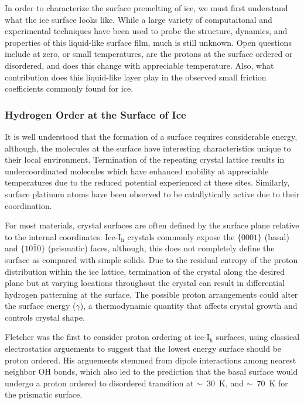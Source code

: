 In order to characterize the surface premelting of ice, we must first
understand what the ice surface looks like. While a large variety of
computaitonal and experimental techniques have been used to probe the
structure, dynamics, and properties of this liquid-like surface film,
much is still unknown. Open questions include at zero, or small
temperatures, are the protons at the surface ordered or disordered,
and does this change with appreciable temperature. Also, what
contribution does this liquid-like layer play in the observed small
friction coefficients commonly found for ice. 

\subsubsection{Hydrogen Order at the Surface of Ice}
It is well understood that the formation of a surface requires
considerable energy, although, the molecules at the surface have
interesting characteristics unique to their local
environment. Termination of the repeating crystal lattice results in
undercoordinated molecules which have enhanced mobility at appreciable
temperatures due to the reduced potential experienced at these
sites.\cite{} Similarly, surface platinum atoms have been observed to
be catallytically active due to their coordination.\cite{}

For most materials, crystal surfaces are often defined by the surface
plane relative to the internal coordinates. Ice-I$_\mathrm{h}$
crystals commonly expose the $\{0001\}$ (basal) and $\{10\bar{1}0\}$
(prismatic) faces, although, this does not completely define the
surface as compared with simple solids. Due to the residual entropy of
the proton distribution within the ice lattice, termination of the
crystal along the desired plane but at varying locations throughout
the crystal can result in differential hydrogen patterning at the
surface. The possible proton arrangements could alter the surface
energy ($\gamma$), a thermodynamic quantity that affects crystal growth and
controls crystal shape.

Fletcher was the first to consider proton ordering at
ice-I$_\mathrm{h}$ surfaces, using classical electrostatics arguements
to suggest that the lowest energy surface should be proton
ordered.\cite{Fletcher1992} His arguements stemmed from dipole
interactions among nearest neighbor OH bonds, which also led to the
prediction that the basal surface would undergo a proton ordered to
disordered transition at $\sim$~30~K, and $\sim$~70~K for the
prismatic surface. 

